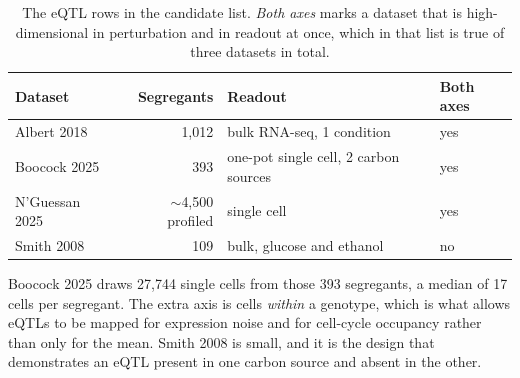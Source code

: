 \begin{table}[H]\centering
\small
\caption[]{The eQTL rows in the candidate list. \emph{Both axes} marks a dataset that is
high-dimensional in perturbation and in readout at once, which in that list is true of
three datasets in total.}
\label{tab:eqtl-rows}
\begin{tabular}{@{}l r l l@{}}
\toprule
Dataset & Segregants & Readout & Both axes \\
\midrule
Albert 2018 \citep{albertGeneticsTransRegulatory2018} & 1,012 & bulk RNA-seq, 1 condition & yes \\
Boocock 2025 \citep{boocockSinglecellEQTLMapping2025} & 393 & one-pot single cell, 2 carbon sources & yes \\
N'Guessan 2025 \citep{nguessanRefiningResolutionYeast2025} & $\sim$4,500 profiled & single cell & yes \\
Smith 2008 \citep{smithGeneEnvironmentInteraction2008} & 109 & bulk, glucose and ethanol & no \\
\bottomrule
\end{tabular}
\end{table}

Boocock 2025 draws 27,744 single cells from those 393 segregants, a median of 17 cells per
segregant. The extra axis is cells \emph{within} a genotype, which is what allows eQTLs to
be mapped for expression noise and for cell-cycle occupancy rather than only for the mean.
Smith 2008 is small, and it is the design that demonstrates an eQTL present in one carbon
source and absent in the other.
